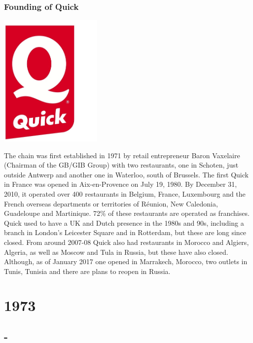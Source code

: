 \documentclass[11pt]{report}
\begin{document}
\subsection{Founding of Quick}
\vspace{2mm}\begin{center}\includegraphics[width=5cm]{./img/quickLogo.jpg}\end{center}
The chain was first established in 1971 by retail entrepreneur Baron Vaxelaire (Chairman of the GB/GIB Group) with two restaurants, one in Schoten, just outside Antwerp and another one in Waterloo, south of Brussels. The first Quick in France was opened in Aix-en-Provence on July 19, 1980. By December 31, 2010, it operated over 400 restaurants in Belgium, France, Luxembourg and the French overseas departments or territories of Réunion, New Caledonia, Guadeloupe and Martinique. 72\% of these restaurants are operated as franchises.\\ \indent Quick used to have a UK and Dutch presence in the 1980s and 90s, including a branch in London's Leicester Square and in Rotterdam, but these are long since closed. From around 2007-08 Quick also had restaurants in Morocco and Algiers, Algeria, as well as Moscow and Tula in Russia, but these have also closed. Although, as of January 2017 one opened in Marrakech, Morocco, two outlets in Tunis, Tunisia and there are plans to reopen in Russia.

\chapter{1973}
\section{-}
\end{document}
